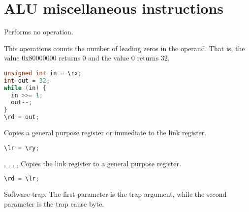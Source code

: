 
\section{ALU miscellaneous instructions}

Performs no operation.

This operations counts the number of leading zeros in the operand. That is, the
value 0x80000000 returns 0 and the value 0 returns 32.

\begin{lstlisting}[numbers=none, basicstyle=\ttfamily\footnotesize, language=C++]
unsigned int in = \rx;
int out = 32;
while (in) {
  in >>= 1;
  out--;
}
\rd = out;
\end{lstlisting}

Copies a general purpose register or immediate to the link register.

\begin{lstlisting}[numbers=none, basicstyle=\ttfamily\footnotesize, language=C++]
\lr = \ry;
\end{lstlisting}

,
,
,
,
Copies the link register to a general purpose register.

\begin{lstlisting}[numbers=none, basicstyle=\ttfamily\footnotesize, language=C++]
\rd = \lr;
\end{lstlisting}

Software trap. The first parameter is the trap argument, while the second
parameter is the trap cause byte.
